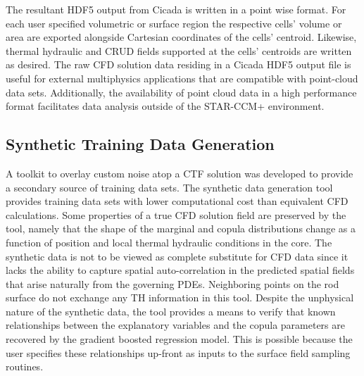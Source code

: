 The resultant HDF5 output from Cicada is written in a point wise format.  For each user specified volumetric or surface region the respective cells' volume or area are exported alongside Cartesian coordinates of the cells' centroid.  Likewise, thermal hydraulic and CRUD fields supported at the cells' centroids are written as desired.  The raw CFD solution data residing in a Cicada HDF5 output file is useful for external multiphysics applications that are compatible with point-cloud data sets.  Additionally, the availability of point cloud data in a high performance format facilitates data analysis outside of the STAR-CCM+ environment.  




\subsection{Synthetic Training Data Generation}
\label{chap:synth}

A toolkit to overlay custom noise atop a CTF solution was developed to provide a secondary source of training data sets.  The synthetic data generation tool provides training data sets with lower computational cost than equivalent CFD calculations.  Some properties of a true CFD solution field are preserved by the tool, namely that the shape of the marginal and copula distributions change as a function of position and local thermal hydraulic conditions in the core.  The synthetic data is not to be viewed as complete substitute for CFD data since it lacks the ability to capture spatial auto-correlation in the predicted spatial fields that arise naturally from the governing PDEs.  Neighboring points on the rod surface do not exchange any TH information in this tool.  Despite the unphysical nature of the synthetic data, the tool provides a means to verify that known relationships between the explanatory variables and the copula parameters are recovered by the gradient boosted regression model.  This is possible because the user specifies these relationships up-front as inputs to the surface field sampling routines. \\

